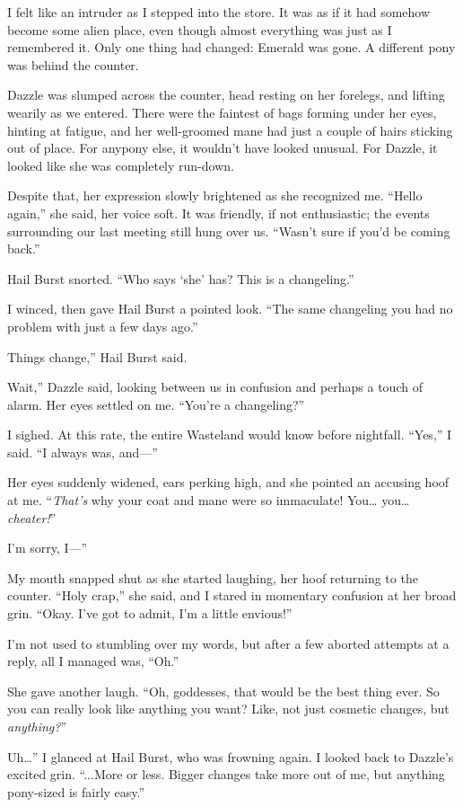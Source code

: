 I felt like an intruder as I stepped into the store. It was as if it had somehow become some alien place, even though almost everything was just as I remembered it. Only one thing had changed: Emerald was gone. A different pony was behind the counter.

Dazzle was slumped across the counter, head resting on her forelegs, and lifting wearily as we entered. There were the faintest of bags forming under her eyes, hinting at fatigue, and her well-groomed mane had just a couple of hairs sticking out of place. For anypony else, it wouldn’t have looked unusual. For Dazzle, it looked like she was completely run-down.

Despite that, her expression slowly brightened as she recognized me. “Hello again,” she said, her voice soft. It was friendly, if not enthusiastic; the events surrounding our last meeting still hung over us. “Wasn’t sure if you’d be coming back.”

Hail Burst snorted. “Who says ‘she’ has? This is a changeling.”

I winced, then gave Hail Burst a pointed look. “The same changeling you had no problem with just a few days ago.”

\leavevmode{}Things change,” Hail Burst said.

\leavevmode{}Wait,” Dazzle said, looking between us in confusion and perhaps a touch of alarm. Her eyes settled on me. “You’re a changeling?”

I sighed. At this rate, the entire Wasteland would know before nightfall. “Yes,” I said. “I always was, and—”

Her eyes suddenly widened, ears perking high, and she pointed an accusing hoof at me. “\textit{That’s} why your coat and mane were so immaculate! You… you… \textit{cheater!}”

\leavevmode{}I’m sorry, I—”

My mouth snapped shut as she started laughing, her hoof returning to the counter. “Holy crap,” she said, and I stared in momentary confusion at her broad grin. “Okay. I’ve got to admit, I’m a little envious!”

I’m not used to stumbling over my words, but after a few aborted attempts at a reply, all I managed was, “Oh.”

She gave another laugh. “Oh, goddesses, that would be the best thing ever. So you can really look like anything you want? Like, not just cosmetic changes, but \textit{anything?}”

\leavevmode{}Uh…” I glanced at Hail Burst, who was frowning again. I looked back to Dazzle’s excited grin. “...More or less. Bigger changes take more out of me, but anything pony-sized is fairly easy.”

